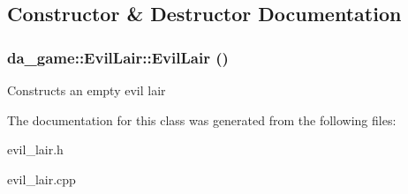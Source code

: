 \subsection{Constructor \& Destructor Documentation}
\hypertarget{classda__game_1_1EvilLair_afe4fe8ac046b4c91ad4e0a0fd4ba7baf}{
\subsubsection[{EvilLair}]{\setlength{\rightskip}{0pt plus 5cm}da\_\-game::EvilLair::EvilLair ()}}
\label{classda__game_1_1EvilLair_afe4fe8ac046b4c91ad4e0a0fd4ba7baf}
Constructs an empty evil lair 

The documentation for this class was generated from the following files:\begin{DoxyCompactItemize}
\item 
evil\_\-lair.h\item 
evil\_\-lair.cpp\end{DoxyCompactItemize}
